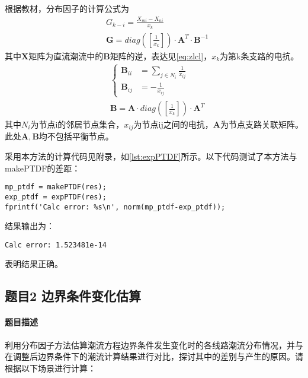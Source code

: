 \documentclass[a4paper,12pt]{article}
\newcommand{\vect}[1]{\boldsymbol{#1}}
\begin{document}
    根据教材\cite{教材}，分布因子的计算公式为
    \begin{equation}
      \label{eq:fbyz}
      \begin{aligned}
        &G_{k-i}=\frac{X_{mi}-X_{ni}}{x_k}\\
        &\vect{G}= diag(\left[\frac{1}{x_k}\right])\cdot \vect{A}^T \cdot \vect{B}^{-1}
      \end{aligned}
    \end{equation}
    其中$\vect{X}$矩阵为直流潮流中的$\vect{B}$矩阵的逆，表达见\cref{eq:zlcl}，$x_k$为第k条支路的电抗。
    \begin{equation}
      \label{eq:zlcl}
      \begin{aligned}
        &\begin{cases}
          \vect{B}_{ii}&=\sum_{j\in N_i}\frac{1}{x_{ij}}\\
          \vect{B}_{ij}&=-\frac{1}{x_{ij}}
        \end{cases}\\
        &\vect{B}=\vect{A}\cdot diag(\left[\frac{1}{x_k}\right]) \cdot \vect{A}^T
      \end{aligned}
    \end{equation}
    其中$N_i$为节点i的邻居节点集合，$x_{ij}$为节点ij之间的电抗，$\vect{A}$为节点支路关联矩阵。此处$\vect{A},\vect{B}$均不包括平衡节点。

    采用本方法的计算代码见附录，如\cref{lst:expPTDF}所示。以下代码测试了本方法与makePTDF的差距：
    \begin{lstlisting}[style=Matlab-editor,basicstyle=\mlttfamily]
%% PTDF
mp_ptdf = makePTDF(res);
exp_ptdf = expPTDF(res);
fprintf('Calc error: %s\n', norm(mp_ptdf-exp_ptdf));
    \end{lstlisting}
    结果输出为：
    \begin{lstlisting}[style=Matlab-editor,basicstyle=\mlttfamily]
Calc error: 1.523481e-14
    \end{lstlisting}
    表明结果正确。

    \subsection{题目2 边界条件变化估算}
    \paragraph{题目描述} 利用分布因子方法估算潮流方程边界条件发生变化时的各线路潮流分布情况，并与在调整后边界条件下的潮流计算结果进行对比，探讨其中的差别与产生的原因。请根据以下场景进行计算：
\end{document}
